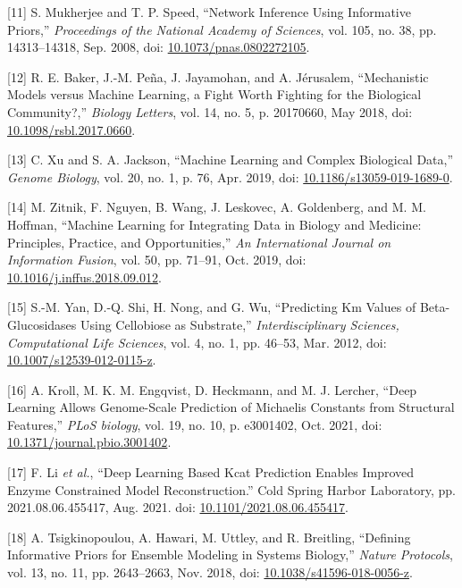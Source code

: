 \documentclass[11pt]{article}
\begin{document}
\hypertarget{citeproc_bib_item_11}{[11] S. Mukherjee and T. P. Speed, “Network Inference Using Informative Priors,” \textit{Proceedings of the National Academy of Sciences}, vol. 105, no. 38, pp. 14313–14318, Sep. 2008, doi: \href{https://doi.org/10.1073/pnas.0802272105}{10.1073/pnas.0802272105}.}

\hypertarget{citeproc_bib_item_12}{[12] R. E. Baker, J.-M. Peña, J. Jayamohan, and A. Jérusalem, “Mechanistic Models versus Machine Learning, a Fight Worth Fighting for the Biological Community?,” \textit{Biology Letters}, vol. 14, no. 5, p. 20170660, May 2018, doi: \href{https://doi.org/10.1098/rsbl.2017.0660}{10.1098/rsbl.2017.0660}.}

\hypertarget{citeproc_bib_item_13}{[13] C. Xu and S. A. Jackson, “Machine Learning and Complex Biological Data,” \textit{Genome Biology}, vol. 20, no. 1, p. 76, Apr. 2019, doi: \href{https://doi.org/10.1186/s13059-019-1689-0}{10.1186/s13059-019-1689-0}.}

\hypertarget{citeproc_bib_item_14}{[14] M. Zitnik, F. Nguyen, B. Wang, J. Leskovec, A. Goldenberg, and M. M. Hoffman, “Machine Learning for Integrating Data in Biology and Medicine: Principles, Practice, and Opportunities,” \textit{An International Journal on Information Fusion}, vol. 50, pp. 71–91, Oct. 2019, doi: \href{https://doi.org/10.1016/j.inffus.2018.09.012}{10.1016/j.inffus.2018.09.012}.}

\hypertarget{citeproc_bib_item_15}{[15] S.-M. Yan, D.-Q. Shi, H. Nong, and G. Wu, “Predicting Km Values of Beta-Glucosidases Using Cellobiose as Substrate,” \textit{Interdisciplinary Sciences, Computational Life Sciences}, vol. 4, no. 1, pp. 46–53, Mar. 2012, doi: \href{https://doi.org/10.1007/s12539-012-0115-z}{10.1007/s12539-012-0115-z}.}

\hypertarget{citeproc_bib_item_16}{[16] A. Kroll, M. K. M. Engqvist, D. Heckmann, and M. J. Lercher, “Deep Learning Allows Genome-Scale Prediction of Michaelis Constants from Structural Features,” \textit{PLoS biology}, vol. 19, no. 10, p. e3001402, Oct. 2021, doi: \href{https://doi.org/10.1371/journal.pbio.3001402}{10.1371/journal.pbio.3001402}.}

\hypertarget{citeproc_bib_item_17}{[17] F. Li \textit{et al.}, “Deep Learning Based Kcat Prediction Enables Improved Enzyme Constrained Model Reconstruction.” Cold Spring Harbor Laboratory, pp. 2021.08.06.455417, Aug. 2021. doi: \href{https://doi.org/10.1101/2021.08.06.455417}{10.1101/2021.08.06.455417}.}

\hypertarget{citeproc_bib_item_18}{[18] A. Tsigkinopoulou, A. Hawari, M. Uttley, and R. Breitling, “Defining Informative Priors for Ensemble Modeling in Systems Biology,” \textit{Nature Protocols}, vol. 13, no. 11, pp. 2643–2663, Nov. 2018, doi: \href{https://doi.org/10.1038/s41596-018-0056-z}{10.1038/s41596-018-0056-z}.}
\end{document}
